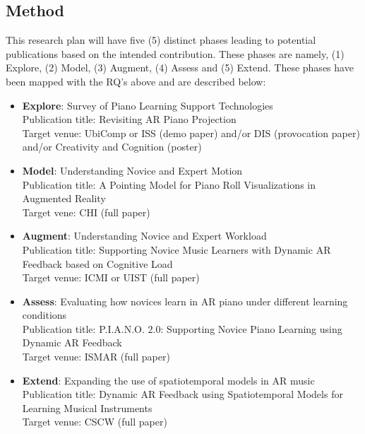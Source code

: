 \documentclass[manuscript,screen]{acmart}
\begin{document}
\subsection{Method}
This research plan will have five (5) distinct phases leading to potential publications based on the intended contribution. These phases are namely, (1) Explore, (2) Model, (3) Augment, (4) Assess and (5) Extend. These phases have been mapped with the RQ's above and are described below: 
\begin{itemize}
    \item \textbf{Explore}: Survey of Piano Learning Support Technologies\\
    Publication title: Revisiting AR Piano Projection\\
    Target venue: UbiComp or ISS (demo paper) and/or DIS (provocation paper) and/or Creativity and Cognition (poster)
    \item \textbf{Model}: Understanding Novice and Expert Motion\\
    Publication title: A Pointing Model for Piano Roll Visualizations in Augmented Reality\\
    Target vene: CHI (full paper)
    \item \textbf{Augment}: Understanding Novice and Expert Workload\\
    Publication title: Supporting Novice Music Learners with Dynamic AR Feedback based on Cognitive Load\\
    Target venue: ICMI or UIST (full paper)
    \item \textbf{Assess}: Evaluating how novices learn in AR piano under different learning conditions\\
    Publication title: P.I.A.N.O. 2.0: Supporting Novice Piano Learning using Dynamic AR Feedback\\
    Target venue: ISMAR (full paper)
    \item \textbf{Extend}: Expanding the use of spatiotemporal models in AR music\\
    Publication title: Dynamic AR Feedback using Spatiotemporal Models for Learning Musical Instruments\\
    Target venue: CSCW (full paper)
\end{itemize}
\end{document}
